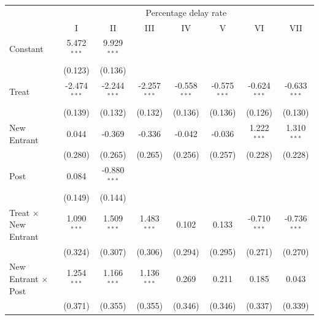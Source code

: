 \documentclass[
]{article}
\begin{document}
\begin{tabular}{lccccccc}
   \toprule
    & \multicolumn{7}{c}{Percentage delay rate}\\
                                              & I              & II             & III            & IV             & V              & VI             & VII\\  
   Constant                                   & 5.472$^{***}$  & 9.929$^{***}$  &                &                &                &                &   \\   
                                              & (0.123)        & (0.136)        &                &                &                &                &   \\   
   Treat                                      & -2.474$^{***}$ & -2.244$^{***}$ & -2.257$^{***}$ & -0.558$^{***}$ & -0.575$^{***}$ & -0.624$^{***}$ & -0.633$^{***}$\\   
                                              & (0.139)        & (0.132)        & (0.132)        & (0.136)        & (0.136)        & (0.126)        & (0.130)\\   
   New Entrant                                & 0.044          & -0.369         & -0.336         & -0.042         & -0.036         & 1.222$^{***}$  & 1.310$^{***}$\\   
                                              & (0.280)        & (0.265)        & (0.265)        & (0.256)        & (0.257)        & (0.228)        & (0.228)\\   
   Post                                       & 0.084          & -0.880$^{***}$ &                &                &                &                &   \\   
                                              & (0.149)        & (0.144)        &                &                &                &                &   \\   
   Treat $\times$ New Entrant                 & 1.090$^{***}$  & 1.509$^{***}$  & 1.483$^{***}$  & 0.102          & 0.133          & -0.710$^{***}$ & -0.736$^{***}$\\   
                                              & (0.324)        & (0.307)        & (0.306)        & (0.294)        & (0.295)        & (0.271)        & (0.270)\\   
   New Entrant $\times$ Post                  & 1.254$^{***}$  & 1.166$^{***}$  & 1.136$^{***}$  & 0.269          & 0.211          & 0.185          & 0.043\\   
                                              & (0.371)        & (0.355)        & (0.355)        & (0.346)        & (0.346)        & (0.337)        & (0.339)\\   

\end{tabular}
\end{document}
